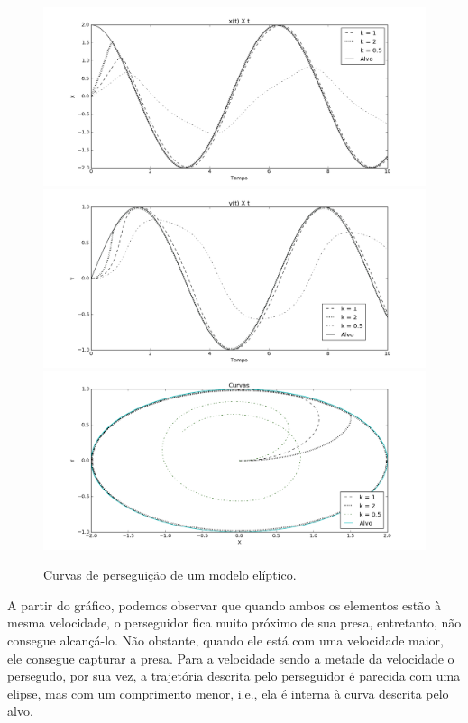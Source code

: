\documentclass[a4paper,10pt]{article}
\begin{document}
  \begin{figure}[H]
   \includegraphics[width=\textwidth]{el-0-X.png}
   \includegraphics[width=\textwidth]{el-0-Y.png}
   \includegraphics[width=\textwidth]{el-0-XY.png}
   \label{fig:curva-el}
   \caption{Curvas de perseguição de um modelo elíptico.}
  \end{figure}
  
  A partir do gráfico, podemos observar que quando ambos os elementos estão à mesma velocidade, o perseguidor fica muito próximo de sua presa, entretanto, não consegue alcançá-lo. Não obstante, quando ele está com uma velocidade maior, ele consegue capturar a presa. Para a velocidade sendo a metade da velocidade o persegudo, por sua vez, a trajetória descrita pelo perseguidor é parecida com uma elipse, mas com um comprimento menor, i.e., ela é interna à curva descrita pelo alvo.
  
\end{document}
